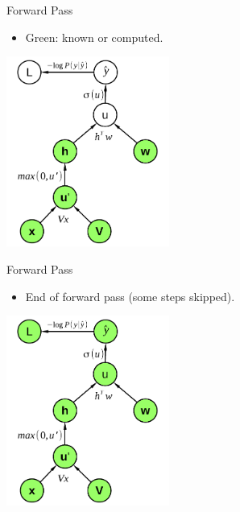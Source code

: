 
\begin{vbframe}{Forward Pass}

\vfill

\begin{itemize}
\item Green: known or computed.
\end{itemize}
\begin{center}
\includegraphics[width = 0.4\textwidth]{./figure/relu_sigmoid_graph_with_loss3}
\end{center}

\vfill

\end{vbframe}



\begin{vbframe}{Forward Pass}

\vfill

\begin{itemize}
\item End of forward pass (some steps skipped).
\end{itemize}
\begin{center}
\includegraphics[width = 0.4\textwidth]{./figure/relu_sigmoid_graph_with_loss4}
\end{center}

\vfill

\end{vbframe}



